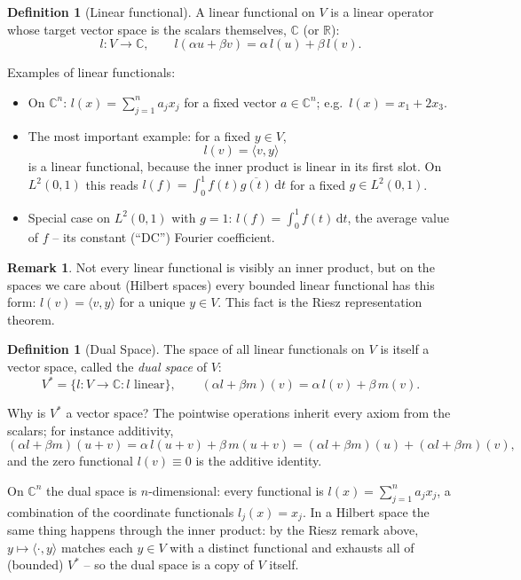\documentclass[11pt]{article}
\newcommand{\1}{\mathbf{1}}
\newcommand{\dd}{\,\mathrm{d}}
\theoremstyle{notestyle}
\theoremstyle{definition}
\newtheorem{definition}[theorem]{Definition}
\newtheorem{remark}[theorem]{Remark}
\begin{document}
\begin{definition}[Linear functional]
\label{def:linear-functional}
A linear functional on $V$ is a linear operator whose target vector space is the
scalars themselves, $\mathbb{C}$ (or $\mathbb{R}$):
$$l : V \rightarrow \mathbb{C}, \qquad l(\alpha u + \beta v) = \alpha\, l(u) + \beta\, l(v).$$
\end{definition}
Examples of linear functionals:
\begin{itemize}
    \item On $\mathbb{C}^n$: $l(x) = \sum_{j=1}^{n} a_j x_j$ for a fixed vector
    $a \in \mathbb{C}^n$; e.g.\ $l(x) = x_1 + 2x_3$.
    \item The most important example: for a fixed $y \in V$,
    $$l(v) = \langle v, y \rangle$$
    is a linear functional, because the inner product is linear in its first slot.
    On $L^2(0, 1)$ this reads $l(f) = \int_0^1 f(t)\overline{g(t)}\dd t$ for a fixed
    $g \in L^2(0, 1)$.
    \item Special case on $L^2(0, 1)$ with $g = 1$: $l(f) = \int_0^1 f(t)\dd t$, the
    average value of $f$ -- its constant (``DC'') Fourier coefficient.
\end{itemize}
\begin{remark}
Not every linear functional is visibly an inner product, but on the spaces we care
about (Hilbert spaces) every bounded linear functional has this form: $l(v) =
\langle v, y\rangle$ for a unique $y \in V$. This fact is the Riesz representation
theorem.
\end{remark}
\begin{definition}[Dual Space]
\label{def:dual-space}
The space of all linear functionals on $V$ is itself a vector space, called the
\emph{dual space} of $V$:
$$V^{*} = \{l : V \rightarrow \mathbb{C} : l \text{ linear}\}, \qquad
(\alpha l + \beta m)(v) = \alpha\, l(v) + \beta\, m(v).$$
\end{definition}
\par Why is $V^{*}$ a vector space? The pointwise operations inherit every axiom
from the scalars; for instance additivity,
$$(\alpha l + \beta m)(u + v) = \alpha\, l(u+v) + \beta\, m(u+v) =
(\alpha l + \beta m)(u) + (\alpha l + \beta m)(v),$$
and the zero functional $l(v) \equiv 0$ is the additive identity.
\par On $\mathbb{C}^n$ the dual space is $n$-dimensional: every functional is
$l(x) = \sum_{j=1}^{n} a_j x_j$, a combination of the coordinate functionals
$l_j(x) = x_j$. In a Hilbert space the same thing happens through the inner
product: by the Riesz remark above, $y \mapsto \langle \cdot, y\rangle$ matches
each $y \in V$ with a distinct functional and exhausts all of (bounded) $V^{*}$ --
so the dual space is a copy of $V$ itself.
\end{document}
